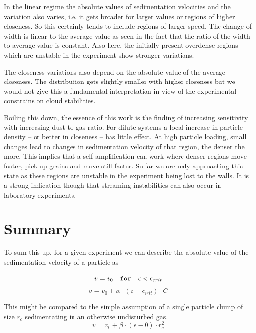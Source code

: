 In the linear regime the absolute values of sedimentation velocities and the variation also varies, i.e. it gets broader for larger values or regions of higher closeness. So this certainly tends to include regions of larger speed. The change of width is linear to the average value as seen in the fact that the ratio of the width to average value is constant. Also here, the initially present overdense regions which are unstable in the experiment show stronger variations.

The closeness variations also depend on the absolute value of the average closeness.
The distribution gets slightly smaller with higher closeness but we would not give
this a fundamental interpretation in view of the experimental constrains on cloud stabilities.

Boiling this down, the essence of this work is the finding of increasing sensitivity
with increasing dust-to-gas ratio. For dilute systems a local increase in particle density -- or better in closeness -- has little effect. At high particle loading, small
changes lead to changes in sedimentation velocity of that region, the denser the more.
This implies that a self-amplification can work where denser regions move faster,
pick up grains and move still faster. So far we are only approaching this state as these
regions are unstable in the experiment being lost to the walls.
It is a strong indication though that streaming instabilities can also occur in laboratory
experiments.
\section{Summary}

To sum this up, for a given experiment we can describe the absolute value of the sedimentation velocity of a particle as 

\begin{equation}
v = v_0  \quad \texttt{for} \quad \epsilon < \epsilon_{crit}\\
\end{equation}
\begin{equation}
v = v_0 + \alpha \cdot (\epsilon-\epsilon_{crit}) \cdot C
\end{equation}

This might be compared to the simple assumption of a single particle clump of size $r_c$ sedimentating in an otherwise undisturbed gas.
\begin{equation}
v = v_0 + \beta \cdot (\epsilon - 0) \cdot r_c^2
\end{equation}

